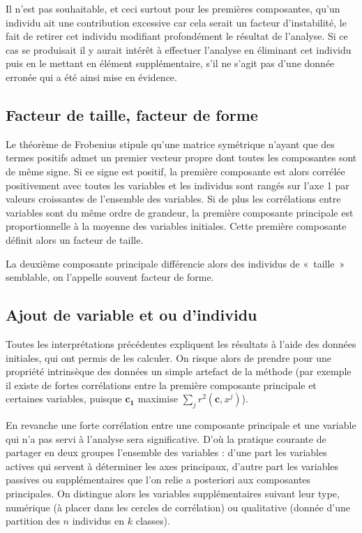 \documentclass[letterpaper,10pt,french]{sphinxmanual}
\begin{document}
\sphinxAtStartPar
{}

\sphinxAtStartPar
Il n’est pas souhaitable, et ceci surtout pour les premières composantes,  qu’un individu ait une contribution excessive car cela serait un facteur d’instabilité, le fait de retirer cet individu modifiant profondément le résultat de l’analyse. Si ce cas se produisait il y aurait intérêt à effectuer l’analyse en éliminant cet individu puis en le mettant en élément supplémentaire, s’il ne s’agit pas d’une donnée erronée qui a été ainsi mise en évidence.


\subsection{Facteur de taille, facteur de forme}
\label{\detokenize{acp:facteur-de-taille-facteur-de-forme}}
\sphinxAtStartPar
Le théorème de Frobenius stipule qu’une matrice symétrique n’ayant que des termes positifs admet un premier vecteur propre dont toutes les composantes sont de même signe. Si ce signe est positif, la première composante est alors corrélée positivement avec toutes les variables et les individus sont rangés sur l’axe 1 par valeurs croissantes de l’ensemble des variables. Si de plus les corrélations entre variables sont du même ordre de grandeur, la première composante principale est proportionnelle à la moyenne des variables initiales. Cette première composante définit alors un facteur de taille.

\sphinxAtStartPar
La deuxième composante principale différencie alors des individus de « taille » semblable, on l’appelle souvent facteur de forme.


\subsection{Ajout de variable et ou d’individu}
\label{\detokenize{acp:ajout-de-variable-et-ou-d-individu}}
\sphinxAtStartPar
Toutes les interprétations précédentes expliquent les résultats à l’aide des données initiales, qui ont permis de les calculer. On risque alors de prendre pour une propriété intrinsèque des données un simple artefact de la méthode (par exemple il existe de fortes corrélations entre la première composante principale et certaines variables, puisque \(\mathbf{c_1}\) maximise \(\sum_j r^2(\mathbf{c},x^j)\)).

\sphinxAtStartPar
En revanche une forte corrélation entre une composante principale et une variable qui n’a pas servi à l’analyse sera significative. D’où la pratique courante de partager en deux groupes l’ensemble des variables : d’une part les variables actives qui servent à déterminer les axes principaux, d’autre part les variables passives ou supplémentaires que l’on relie a posteriori aux composantes principales. On distingue alors les variables supplémentaires suivant leur type, numérique (à placer dans les cercles de corrélation) ou qualitative (donnée d’une partition des \(n\) individus en \(k\) classes).
\end{document}
